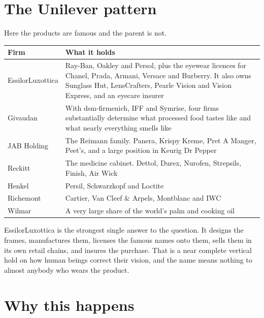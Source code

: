 \documentclass[11pt,a4paper]{article}
\begin{document}
\section{The Unilever pattern}

Here the products are famous and the parent is not.

\begin{center}
\begin{tabular}{@{}l@{\hspace{5mm}}>{\raggedright\arraybackslash}p{}@{}}
\toprule
\textbf{Firm} & \textbf{What it holds} \\
\midrule
EssilorLuxottica & Ray-Ban, Oakley and Persol, plus the eyewear licences for Chanel,
                   Prada, Armani, Versace and Burberry. It also owns Sunglass Hut,
                   LensCrafters, Pearle Vision and Vision Express, and an eyecare
                   insurer \\[1mm]
Givaudan         & With dsm-firmenich, IFF and Symrise, four firms substantially
                   determine what processed food tastes like and what nearly
                   everything smells like \\[1mm]
JAB Holding      & The Reimann family. Panera, Krispy Kreme, Pret A Manger, Peet's,
                   and a large position in Keurig Dr Pepper \\[1mm]
Reckitt          & The medicine cabinet. Dettol, Durex, Nurofen, Strepsils, Finish,
                   Air Wick \\[1mm]
Henkel           & Persil, Schwarzkopf and Loctite \\[1mm]
Richemont        & Cartier, Van Cleef \& Arpels, Montblanc and IWC \\[1mm]
Wilmar           & A very large share of the world's palm and cooking oil \\
\bottomrule
\end{tabular}
\end{center}

EssilorLuxottica is the strongest single answer to the question. It designs the
frames, manufactures them, licenses the famous names onto them, sells them in its
own retail chains, and insures the purchase. That is a near complete vertical hold
on how human beings correct their vision, and the name means nothing to almost
anybody who wears the product.

\section{Why this happens}
\end{document}
